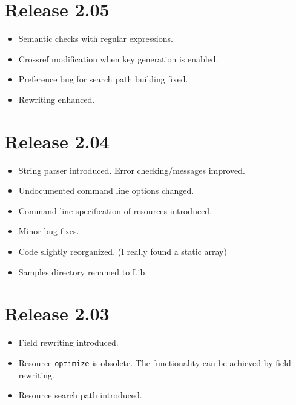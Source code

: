 \documentclass[11pt,a4paper]{scrartcl}
\newcommand\rsc[1]{\texttt{#1}}
\newcommand\File[1]{\textsf{#1}}
\newenvironment{Release}[2]{\section*{Release #1}\begin{itemize}}{\end{itemize}}
\newenvironment{Fix}[1]{\item }{}
\newenvironment{New}[1]{\item }{}
\newenvironment{Update}[1]{\item }{}
\begin{document}
 \begin{Release}{2.05}{}
  \begin{New}{gene}
    Semantic checks with regular expressions.
  \end{New}
  \begin{Update}{gene}
    Crossref modification when key generation is enabled.
  \end{Update}
  \begin{Fix}{gene}
    Preference bug for search path building fixed.
  \end{Fix}
  \begin{Update}{gene}
    Rewriting enhanced.
  \end{Update}
 \end{Release}

 \begin{Release}{2.04}{}
  \begin{New}{gene}
    String parser introduced. Error checking/messages improved.
  \end{New}
  \begin{Update}{gene}
    Undocumented command line options changed.
  \end{Update}
  \begin{New}{gene}
    Command line specification of resources introduced.
  \end{New}
  \begin{Fix}{gene}
    Minor bug fixes.
  \end{Fix}
  \begin{Update}{gene}
    Code slightly reorganized. (I really found a static array)
  \end{Update}
  \begin{Update}{gene}
    Samples directory renamed to \File{Lib}.
  \end{Update}
 \end{Release}

 \begin{Release}{2.03}{}
  \begin{New}{gene}
    Field rewriting introduced.
  \end{New}
  \begin{Update}{gene}
    Resource \rsc{optimize} is obsolete. The functionality can
    be achieved by field rewriting.
  \end{Update}
  \begin{New}{gene}
    Resource search path introduced.
  \end{New}
 \end{Release}
\end{document}
